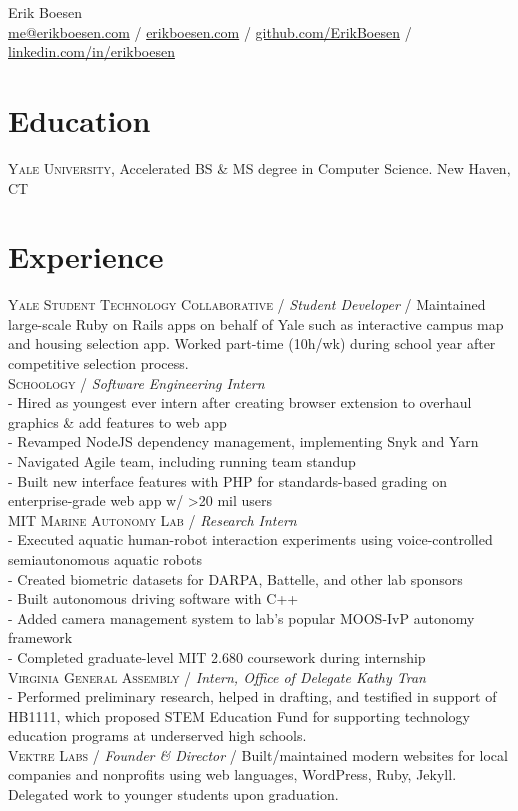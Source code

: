 \documentclass[10pt, a4paper]{article}
\newcommand{\years}[1]{\marginnote{\scriptsize #1}}
\begin{document}
{\LARGE Erik Boesen}\\
\href{mailto:me@erikboesen.com}{me@erikboesen.com} / \href{https://erikboesen.com}{erikboesen.com} / \href{https://github.com/ErikBoesen}{github.com/ErikBoesen} / \href{https://www.linkedin.com/in/erikboesen}{linkedin.com/in/erikboesen}\\

\section*{Education}
\noindent
\years{2019-2023}\textsc{Yale University}, Accelerated BS \& MS degree in Computer Science. New Haven, CT\\

\section*{Experience}
\years{2019-}\textsc{Yale Student Technology Collaborative} / \textit{Student Developer} /  Maintained large-scale Ruby on Rails apps on behalf of Yale such as interactive campus map and housing selection app. Worked part-time (10h/wk) during school year after competitive selection process.\\
\years{2019}\textsc{Schoology} / \textit{Software Engineering Intern}\\
- Hired as youngest ever intern after creating browser extension to overhaul graphics \& add features to web app\\
- Revamped NodeJS dependency management, implementing Snyk and Yarn\\
- Navigated Agile team, including running team standup\\
- Built new interface features with PHP for standards-based grading on enterprise-grade web app w/ >20 mil users\\
\years{2018}\textsc{MIT Marine Autonomy Lab} / \textit{Research Intern}\\
- Executed aquatic human-robot interaction experiments using voice-controlled semiautonomous aquatic robots\\
- Created biometric datasets for DARPA, Battelle, and other lab sponsors\\
- Built autonomous driving software with C++\\
- Added camera management system to lab's popular MOOS-IvP autonomy framework\\
- Completed graduate-level MIT 2.680 coursework during internship\\
\years{2018}\textsc{Virginia General Assembly} / \textit{Intern, Office of Delegate Kathy Tran}\\
- Performed preliminary research, helped in drafting, and testified in support of HB1111, which proposed STEM Education Fund for supporting technology education programs at underserved high schools.\\
\years{2016-2019}\textsc{Vektre Labs} / \textit{Founder \& Director} / Built/maintained modern websites for local companies and nonprofits using web languages, WordPress, Ruby, Jekyll. Delegated work to younger students upon graduation.\\
\end{document}
